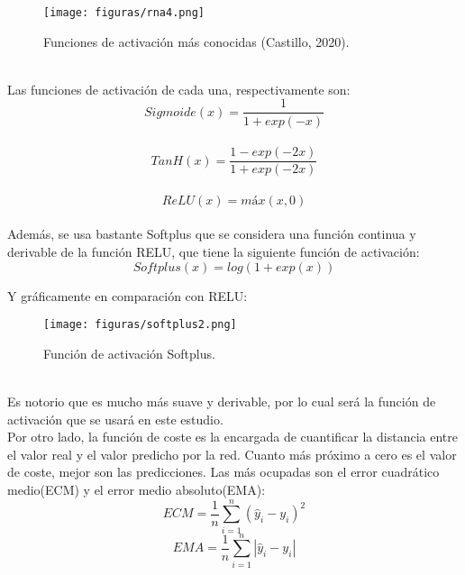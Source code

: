 \documentclass{report}
\begin{document}
\begin{figure}[htp]
        \centering
    	\texttt{[image: figuras/rna4.png]}
    	\label{fig: Figura1}
    	\caption{Funciones de activación más conocidas (Castillo, 2020).}
        \end{figure}\\ 
        
Las funciones de activación de cada una, respectivamente son:\\

 \begin{equation}
            Sigmoide(x)=\frac{1}{1+exp(-x)}
        \end{equation}\\
        \begin{equation}
            TanH(x)=\frac{1-exp(-2x)}{1+exp(-2x)}
        \end{equation}\\
        \begin{equation}
            ReLU(x)=máx(x,0)
        \end{equation}\\
        
Además, se usa bastante Softplus que se considera una función continua y derivable de la función RELU, que tiene la siguiente función de activación:\\
    \begin{equation}
        Softplus(x)=log(1+exp(x))
    \end{equation}

Y gráficamente en comparación con RELU:\\

        \begin{figure}[htp]
        \centering
    	\texttt{[image: figuras/softplus2.png]}
    	\label{fig: Figura1}
    	\caption{Función de activación Softplus.}
        \end{figure}\\
 
 Es notorio que es mucho más suave y derivable, por lo cual será la función de activación que se usará en este estudio.\\     
 Por otro lado, la función de coste es la encargada de cuantificar la distancia entre el valor real y el valor predicho por la red. Cuanto más próximo a cero es el valor de coste, mejor son las predicciones. Las más ocupadas son el error cuadrático medio(ECM) y el error medio absoluto(EMA):\\
        \begin{equation}
            ECM=\frac{1}{n}\sum_{i=1}^{n}\left(\hat{y}_{i}-y_{i} \right)^{2}
        \end{equation}
        \begin{equation}
            EMA=\frac{1}{n}\sum_{i=1}^{n}|\hat{y}_{i}-y_{i}|
        \end{equation}     
        
\end{document}
